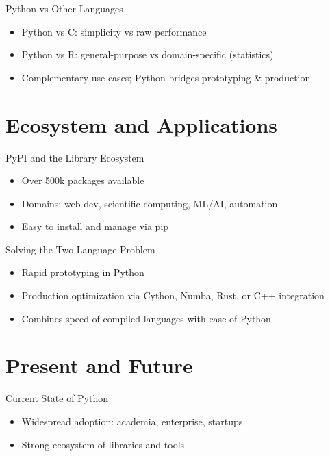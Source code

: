 \documentclass[12pt, aspectratio=169]{beamer}
\begin{document}
    \begin{frame}{Python vs Other Languages}
        \begin{itemize}
            \item Python vs C: simplicity vs raw performance
            \item Python vs R: general-purpose vs domain-specific (statistics)
            \item Complementary use cases; Python bridges prototyping \& production
        \end{itemize}
    \end{frame}


    \section{Ecosystem and Applications}

    \begin{frame}{PyPI and the Library Ecosystem}
        \begin{itemize}
            \item Over 500k packages available
            \item Domains: web dev, scientific computing, ML/AI, automation
            \item Easy to install and manage via pip
        \end{itemize}
    \end{frame}


    \begin{frame}{Solving the Two-Language Problem}
        \begin{itemize}
            \item Rapid prototyping in Python
            \item Production optimization via Cython, Numba, Rust, or C++ integration
            \item Combines speed of compiled languages with ease of Python
        \end{itemize}
    \end{frame}


    \section{Present and Future}

    \begin{frame}{Current State of Python}
        \begin{itemize}
            \item Widespread adoption: academia, enterprise, startups
            \item Strong ecosystem of libraries and tools
        \end{itemize}
    \end{frame}
\end{document}

